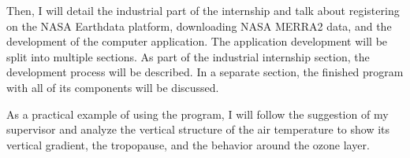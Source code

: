 \documentclass[../00_main.tex]{subfiles}
\begin{document}
Then, I will detail the industrial part of the internship and talk about 
registering on the NASA Earthdata platform, downloading NASA MERRA2 data, and 
the development of the computer application. The application development will 
be split into multiple sections. As part of the industrial internship section, 
the development process will be described. In a separate section, the finished 
program with all of its components will be discussed.\newline

As a practical example of using the program, I will follow the suggestion of my 
supervisor and analyze the vertical structure of the air temperature to show 
its vertical gradient, the tropopause, and the behavior around the ozone layer. 
\end{document}
